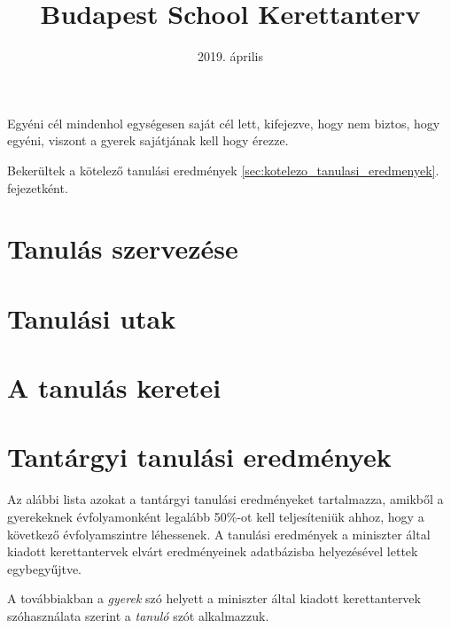 \documentclass[magyar,12pt,a4paper,oneside,draft]{report}
\begin{document}
\newif\ifkerettanterv
\kerettantervtrue

\title{Budapest School Kerettanterv}
\author{}
\date{2019. \'aprilis}
\maketitle

\tableofcontents
\newpage

Egyéni cél mindenhol egységesen saját cél lett, kifejezve, hogy nem biztos,
hogy egyéni, viszont a gyerek sajátjának kell hogy érezze.

Bekerültek a kötelező tanulási eredmények
\ref{sec:kotelezo_tanulasi_eredmenyek}. fejezetként.


\chapter{Tanulás szervezése}


\chapter{Tanulási utak}


\chapter{A tanulás keretei}


\chapter{Tantárgyi tanulási eredmények}
\label{sec:tantargyi_tanulasi_eredmenyek}
Az alábbi lista azokat a tantárgyi tanulási eredményeket tartalmazza, amikből a
gyerekeknek évfolyamonként legalább 50\%-ot kell teljesíteniük ahhoz, hogy a következő évfolyamszintre léhessenek. 
A tanulási eredmények a miniszter
által kiadott kerettantervek\cite{ofi:kerettanterv}  elvárt eredményeinek adatbázisba
helyezésével lettek egybegyűjtve.

A továbbiakban a \emph{gyerek} szó helyett a miniszter által kiadott
kerettantervek szóhasználata szerint a \emph{tanuló} szót alkalmazzuk.


{}
\label{sec:bibliographyk}

\end{document}
